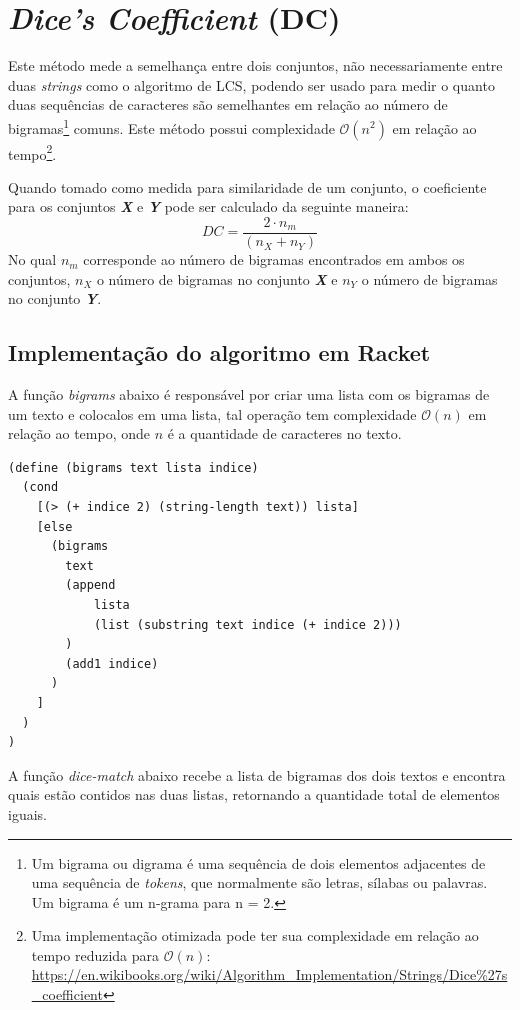 \documentclass[12pt]{article}
\begin{document}
\newpage

\section{\textit{Dice's Coefficient} (DC)}\label{sec:dice}

Este método mede a semelhança entre dois conjuntos, não necessariamente entre duas \textit{strings} como o algoritmo de LCS, podendo ser usado para medir o quanto duas sequências de caracteres são semelhantes em relação ao número de bigramas\footnote{Um bigrama ou digrama é uma sequência de dois elementos adjacentes de uma sequência de \textit{tokens}, que normalmente são letras, sílabas ou palavras. Um bigrama é um n-grama para n = 2.} comuns. Este método possui complexidade $\mathcal{O}(n^2)$ em relação ao tempo\footnote{Uma implementação otimizada pode ter sua complexidade em relação ao tempo reduzida para  $\mathcal{O}(n)$: \url{https://en.wikibooks.org/wiki/Algorithm_Implementation/Strings/Dice\%27s_coefficient}}.

Quando tomado como medida para similaridade de um conjunto, o coeficiente para os conjuntos \textbf{\textit{X}} e \textbf{\textit{Y}} pode ser calculado da seguinte maneira:
$$DC = \frac{2 \cdot n_{m}}{(n_{X} + n_{Y})} $$
No qual $n_{m}$ corresponde ao número de bigramas encontrados em ambos os conjuntos, $n_{X}$ o número de bigramas no conjunto \textbf{\textit{X}} e $n_{Y}$ o número de bigramas no conjunto \textbf{\textit{Y}}.

\subsection{Implementação do algoritmo em Racket}

A função \textit{bigrams} abaixo é responsável por criar uma lista com os bigramas de um texto e colocalos em uma lista, tal operação tem complexidade $\mathcal{O}(n)$ em relação ao tempo, onde $n$ é a quantidade de caracteres no texto.

\begin{lstlisting}
(define (bigrams text lista indice)
  (cond
    [(> (+ indice 2) (string-length text)) lista]
    [else 
      (bigrams 
        text
        (append
            lista
            (list (substring text indice (+ indice 2)))
        )
        (add1 indice)
      )
    ]
  )
)
\end{lstlisting}

\newpage

A função \textit{dice-match} abaixo recebe a lista de bigramas dos dois textos e encontra quais estão contidos nas duas listas, retornando a quantidade total de elementos iguais.
\end{document}
